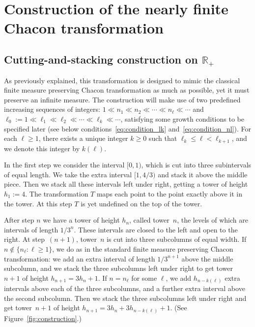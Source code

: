 \documentclass[AHL,Unicode,longabstracts]{cedram}
\newcommand{\egdef}{:=}
\newcommand{\RR}{\mathbb{R}}
\begin{document}
\section{Construction of the nearly finite Chacon transformation}\label{sec:construction}

\subsection{Cutting-and-stacking construction on \texorpdfstring{$\RR_+$}{R+}}\label{sec:cutandstack}

As previously explained, this transformation is designed to mimic the classical finite measure preserving Chacon transformation as much as possible, yet it must preserve an infinite measure. The construction will make use of two predefined increasing sequences of integers: $1\ll n_1 \ll n_2 \ll \cdots \ll n_\ell \ll \cdots$ and $\ell_0:=1\ll \ell_1\ll \ell_2\ll\cdots\ll\ell_k\ll\cdots$, satisfying some growth conditions to be specified later (see below conditions~\eqref{eq:condition_lk} and~\eqref{eq:condition_nl}). For each $\ell\ge1$, there exists a unique integer $k\ge0$ such that $\ell_k\le \ell <\ell_{k+1}$, and we denote this integer by $k(\ell)$.

In the first step we consider the interval $[0,1)$, which is cut into three subintervals of equal length. We take the extra interval $[1,4/3)$ and stack it above the middle piece. Then we stack all these intervals left under right, getting a tower of height $h_1\egdef4$. The transformation $T$ maps each point to the point exactly above it in the tower. At this step $T$ is yet undefined on the top of the tower.

After step $n$ we have a tower of height $h_n$, called tower~$n$, the levels of which are intervals of length $1/3^n$. These intervals are closed to the left and open to the right. At step~$(n+1)$, tower~$n$ is cut into three subcolumns of equal width. If $n\notin\{n_\ell:\ell\ge1\}$, we do as in the standard finite measure preserving Chacon transformation: we add an extra interval of length $1/3^{n+1}$ above the middle subcolumn, and we stack the three subcolumns left under right to get tower~$n+1$ of height $h_{n+1}=3h_n+1$. If $n=n_\ell$ for some $\ell$, we add $h_{n-k(\ell)}$ extra intervals above each of the three subcolumns, and a further extra interval above the second subcolumn. Then we stack the three subcolumns left under right and get tower~$n+1$ of height $h_{n+1}=3h_n + 3h_{n-k(\ell)} + 1$. (See Figure~\ref{fig:construction}.)
\end{document}
